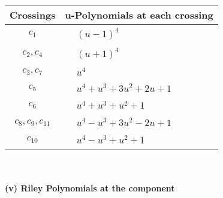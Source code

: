 \documentclass[1p]{elsarticle_modified}
\theoremstyle{definition}
\begin{document}
\begin{tabular}{m{50pt}|m{274pt}}
Crossings & \hspace{64pt}u-Polynomials at each crossing \\
\hline $$\begin{aligned}c_{1}\end{aligned}$$&$\begin{aligned}
&(u-1)^4
\end{aligned}$\\
\hline $$\begin{aligned}c_{2},c_{4}\end{aligned}$$&$\begin{aligned}
&(u+1)^4
\end{aligned}$\\
\hline $$\begin{aligned}c_{3},c_{7}\end{aligned}$$&$\begin{aligned}
&u^4
\end{aligned}$\\
\hline $$\begin{aligned}c_{5}\end{aligned}$$&$\begin{aligned}
&u^4+u^3+3 u^2+2 u+1
\end{aligned}$\\
\hline $$\begin{aligned}c_{6}\end{aligned}$$&$\begin{aligned}
&u^4+u^3+u^2+1
\end{aligned}$\\
\hline $$\begin{aligned}c_{8},c_{9},c_{11}\end{aligned}$$&$\begin{aligned}
&u^4- u^3+3 u^2-2 u+1
\end{aligned}$\\
\hline $$\begin{aligned}c_{10}\end{aligned}$$&$\begin{aligned}
&u^4- u^3+u^2+1
\end{aligned}$\\
\hline
\end{tabular}\\~\\
\newpage\renewcommand{\arraystretch}{1}
\flushleft \textbf{(v) Riley Polynomials at the component}\newline \\
\end{document}
